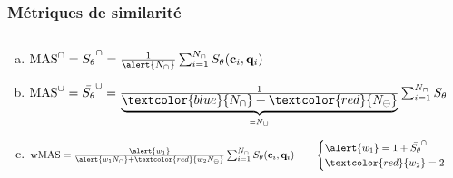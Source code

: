 \documentclass[aspectratio=169, usepdftitle=false, xcolor={dvipsnames}, 9pt,table]{beamer}
\begin{document}
\begin{frame}[t]
    \frametitle{Métriques de similarité}
    \begin{columns}[t]
        \begin{column}{0.66\textwidth}
            \footnotesize
            \vspace{-1.5em}
            \begin{examples}
                \begin{enumerate}[(a)]
                    \item<1-> $\text{MAS}^\cap = \bar{S_\theta}^\cap = \frac{1}{\alert{N_\cap}} \sum_{i=1}^{N_\cap} S_\theta (\mathbf{c}_i, \mathbf{q}_i)$
                    \item<2-> $\text{MAS}^\cup = \bar{S_\theta}^\cup = \frac{1}{\underbrace{\textcolor{blue}{N_\cap} + \textcolor{red}{N_\ominus}}_{=
                        N_\cup}} \sum_{i=1}^{N_\cap} S_\theta (\mathbf{c}_i, \mathbf{q}_i)$
                    \item<3-> $\text{wMAS} = \frac{ \alert{w_1}}{ \alert{w_1 N_\cap} + \textcolor{red}{w_2 N_\ominus}} \sum_{i=1}^{N_\cap} S_{\theta}(\mathbf{c}_i, \mathbf{q}_i) \quad\quad 
                    \begin{cases}
                        \alert{w_1} = 1 + \bar{S_\theta}^\cap \\
                        \textcolor{red}{w_2} = 2 - \bar{S_\theta}^\cap \\
                    \end{cases}$
                \end{enumerate}
            \end{examples}
        \end{column}
        \begin{column}{0.33\textwidth}
            \footnotesize
\end{column}
\end{columns}
\end{frame}
\end{document}
